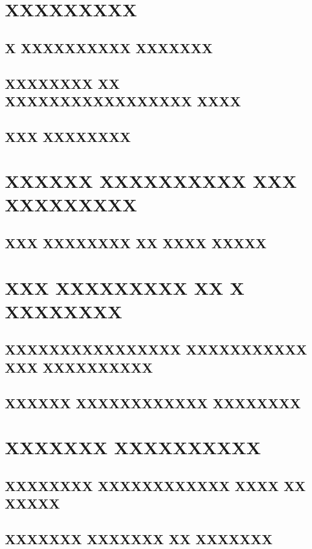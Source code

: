 \documentclass{acmart}
\begin{document}
\title{}
\begin{abstract} \end{abstract}
\maketitle
\section{XXXXXXXXX}\subsection{X XXXXXXXXXX XXXXXXX}\subsection{XXXXXXXX XX XXXXXXXXXXXXXXXXX XXXX}\subsection{XXX XXXXXXXX}
\section{XXXXXX XXXXXXXXXX XXX XXXXXXXXX}\subsection{XXX XXXXXXXX XX XXXX XXXXX}
\section{XXX XXXXXXXXX XX X XXXXXXXX}\subsection{XXXXXXXXXXXXXXXX XXXXXXXXXXX XXX XXXXXXXXXX}
\subsection{XXXXXX XXXXXXXXXXXX XXXXXXXX}
\section{XXXXXXX XXXXXXXXXX}\subsection{XXXXXXXX XXXXXXXXXXXX XXXX XX XXXXX}\subsection{XXXXXXX XXXXXXX XX XXXXXXX}
\end{document}
